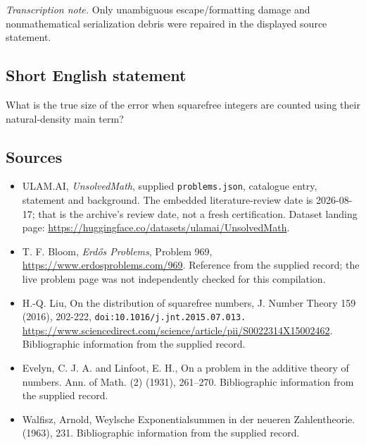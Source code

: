 \documentclass[11pt,a4paper]{article}
\begin{document}
{\small\emph{Transcription note.} Only unambiguous escape/formatting damage and nonmathematical serialization debris were repaired in the displayed source statement.}

\subsection{Short English statement}

What is the true size of the error when squarefree integers are counted using their natural-density main term?

\subsection{Sources}

{\small

\begin{itemize}

\item[\hypertarget{source:statement:1}{S1}] ULAM.AI, \emph{UnsolvedMath}, supplied \texttt{problems.json}, catalogue entry, statement and background. The embedded literature-review date is 2026-08-17; that is the archive’s review date, not a fresh certification. Dataset landing page: \url{https://huggingface.co/datasets/ulamai/UnsolvedMath}.

\item[\hypertarget{source:statement:2}{S2}] T. F. Bloom, \emph{Erdős Problems}, Problem 969, \url{https://www.erdosproblems.com/969}. Reference from the supplied record; the live problem page was not independently checked for this compilation.

\item[\hypertarget{source:statement:3}{S3}] H.-Q. Liu, On the distribution of squarefree numbers, J. Number Theory 159 (2016), 202-222, \nolinkurl{doi:10.1016/j.jnt.2015.07.013.} \url{https://www.sciencedirect.com/science/article/pii/S0022314X15002462}. Bibliographic information from the supplied record.

\item[\hypertarget{source:statement:4}{S4}] Evelyn, C. J. A. and Linfoot, E. H., On a problem in the additive theory of numbers. Ann. of Math. (2) (1931), 261--270. Bibliographic information from the supplied record.

\item[\hypertarget{source:statement:5}{S5}] Walfisz, Arnold, Weylsche {E}xponentialsummen in der neueren {Z}ahlentheorie. (1963), 231. Bibliographic information from the supplied record.

\end{itemize}

}

\label{end:statement}
\end{document}
